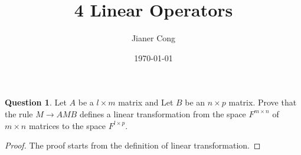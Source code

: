 \documentclass{article}
\title{4 Linear Operators}
\author{Jianer Cong}
\date{\today}
\theoremstyle{definition}
\newtheorem{qst}{Question}[section]
\begin{document}
\maketitle
\begin{qst}
  Let $A$ be a $l \times m$ matrix and Let $B$ be an $n \times p$ matrix. Prove
  that the rule $M \to AMB$ defines a linear transformation from the space
  $F^{m \times n}$ of $m \times n$ matrices to the space $F^{l \times p}$.
\end{qst}
\begin{proof}
  The proof starts from the definition of linear transformation.
\end{proof}
\end{document}
